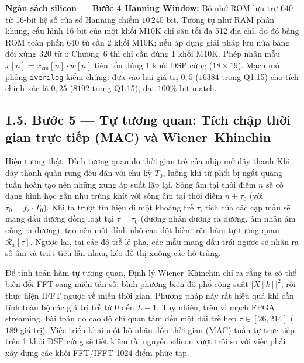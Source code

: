 \begin{costbox}
\textbf{Ngân sách silicon --- Bước 4 Hanning Window:}
Bộ nhớ ROM lưu trữ $640$ từ 16-bit hệ số cửa sổ Hanning chiếm $10\,240$ bit. Tương tự như RAM phân khung, cấu hình 16-bit của một khối M10K chỉ sâu tối đa 512 địa chỉ, do đó bảng ROM toàn phần $640$ từ cần 2 khối M10K; nếu áp dụng giải pháp lưu nửa bảng đối xứng $320$ từ ở Chương~6 thì chỉ cần đúng 1 khối M10K. Phép nhân mẫu $\tilde{x}[n] = x_{\mathrm{zm}}[n] \cdot w[n]$ tiêu tốn đúng 1 khối DSP cứng ($18 \times 19$). Mạch mô phỏng \texttt{iverilog} kiểm chứng: đưa vào hai giá trị $0{,}5$ ($16384$ trong Q1.15) cho tích chính xác là $0{,}25$ ($8192$ trong Q1.15), đạt $100\%$ bit-match.
\end{costbox}

\subsection*{1.5. Bước 5 --- Tự tương quan: Tích chập thời gian trực tiếp (MAC) và Wiener--Khinchin}

\begin{firstprin}{Hiện tượng thật: Đỉnh tương quan đo thời gian trễ của nhịp mở dây thanh}
Khi dây thanh quản rung đều đặn với chu kỳ $T_0$, luồng khí từ phổi bị ngắt quãng tuần hoàn tạo nên những xung áp suất lặp lại. Sóng âm tại thời điểm $n$ sẽ có dạng hình học gần như trùng khít với sóng âm tại thời điểm $n + \tau_0$ (với $\tau_0 = f_s \cdot T_0$). Khi ta trượt tín hiệu đi một khoảng trễ $\tau$, tích của các cặp mẫu sẽ mang dấu dương đồng loạt tại $\tau = \tau_0$ (dương nhân dương ra dương, âm nhân âm cũng ra dương), tạo nên một đỉnh nhô cao đột biến trên hàm tự tương quan $\mathcal{R}_x[\tau]$. Ngược lại, tại các độ trễ lẻ pha, các mẫu mang dấu trái ngược sẽ nhân ra số âm và triệt tiêu lẫn nhau, kéo đồ thị xuống các hố trũng.

Để tính toán hàm tự tương quan, Định lý Wiener--Khinchin chỉ ra rằng ta có thể biến đổi FFT sang miền tần số, bình phương biên độ phổ công suất $|X[k]|^2$, rồi thực hiện IFFT ngược về miền thời gian. Phương pháp này rất hiệu quả khi cần tính toàn bộ các giá trị trễ từ $0$ đến $L-1$. Tuy nhiên, trên vi mạch FPGA streaming, bài toán đo cao độ chỉ quan tâm đến một dải trễ hẹp $\tau \in [26, 214]$ ($189$ giá trị). Việc triển khai một bộ nhân dồn thời gian (MAC) tuần tự trực tiếp trên 1 khối DSP cứng sẽ tiết kiệm tài nguyên silicon vượt trội so với việc phải xây dựng các khối FFT/IFFT 1024 điểm phức tạp.
\end{firstprin}

